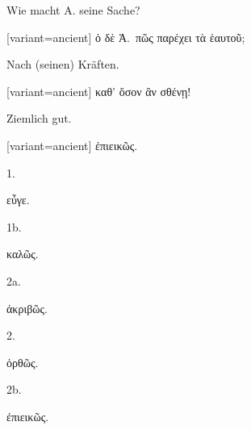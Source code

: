 Wie macht A. seine Sache? 

\switchcolumn

\begin{greek}[variant=ancient]%
ὁ δὲ Ἁ.\ πῶς παρέχει τὰ ἑαυτοῦ;

\end{greek}%
\switchcolumn*

Nach (seinen) Kräften. 

\switchcolumn

\begin{greek}[variant=ancient]%
καθ' ὅσον ἂν σθένῃ!

\end{greek}%
\switchcolumn*

Ziemlich gut. 

\switchcolumn

\begin{greek}[variant=ancient]%
ἐπιεικῶς.

\end{greek}%
\switchcolumn*\bgroup

\myafterpagetrue{}1. 

\egroup\switchcolumn\bgroup

\textgreek[variant=ancient]{εὖγε.}

\egroup\switchcolumn*\bgroup

1b.

\egroup\switchcolumn\bgroup

\textgreek[variant=ancient]{καλῶς.}

\egroup\switchcolumn*\bgroup

2a.

\egroup\switchcolumn\bgroup

\textgreek[variant=ancient]{ἀκριβῶς.}

\egroup\switchcolumn*\bgroup

2.

\egroup\switchcolumn\bgroup

\textgreek[variant=ancient]{ὀρθῶς.}

\egroup\switchcolumn*\bgroup

2b.

\egroup\switchcolumn\bgroup

\textgreek[variant=ancient]{ἐπιεικῶς.}

\egroup\switchcolumn*\bgroup


